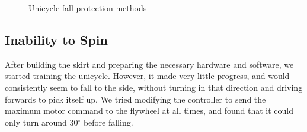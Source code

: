 \documentclass{IIBproject}
\begin{document}
\begin{figure}[htpb]
  \begin{center}
    \end{center}
    \caption{Unicycle fall protection methods}
    \label{fig:fall_protection}
    \end{figure}

\subsection{Inability to Spin}

After building the skirt and preparing the necessary hardware and software, we
started training the unicycle. However, it made very little progress, and
would consistently seem to fall to the side, without turning in that direction
and driving forwards to pick itself up. We tried modifying the controller to
send the maximum motor command to the flywheel at all times, and found that it
could only turn around 30$^\circ$ before falling.
\end{document}
